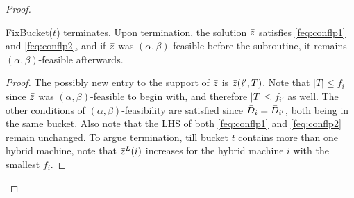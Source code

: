 \begin{proof}
%	
\begin{claim}\label{fclm:step2}
	{\sf FixBucket}($t$) terminates. Upon termination, the solution $\bar z$ satisfies \eqref{feq:conflp1} and \eqref{feq:conflp2}, and
	if $\bar z$ was $(\alpha,\beta)$-feasible before the subroutine, it remains $(\alpha,\beta)$-feasible afterwards.
\end{claim}
	\begin{proof}
The possibly new entry to the support of $\bar z$ is $\bar z(i',T)$. Note that $|T| \leq f_i$ since $\bar z$ was $(\alpha,\beta)$-feasible to begin with,  and therefore $|T|\leq f_{i'}$ as well.
The other conditions of $(\alpha,\beta)$-feasibility are satisfied since $\bar{D}_i = \bar{D}_{i'}$, both being in the same bucket.
Also note that the LHS of both \eqref{feq:conflp1} and \eqref{feq:conflp2} remain unchanged.
To argue termination, till bucket $t$ contains more than one hybrid machine, note that $\bar z^L(i)$ increases for the hybrid machine $i$ with the smallest $f_i$.
	\end{proof}




%	
%	
	
%	
	

\end{proof}
